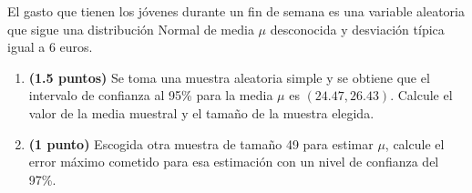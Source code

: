 
El gasto que tienen los jóvenes durante un fin de semana es una variable aleatoria que sigue una distribución Normal de media $\mu$ desconocida y desviación típica igual a 6 euros.
\begin{enumerate}[label=\alph*)]
\item \textbf{(1.5 puntos)} Se toma una muestra aleatoria simple y se obtiene que el intervalo de confianza al 95\% para la media $\mu$ es $(24.47,26.43)$. Calcule el valor de la media muestral y el tamaño de la muestra elegida.
\item \textbf{(1 punto)} Escogida otra muestra de tamaño 49 para estimar $\mu$, calcule el error máximo cometido para esa estimación con un nivel de confianza del 97\%.
\end{enumerate}
